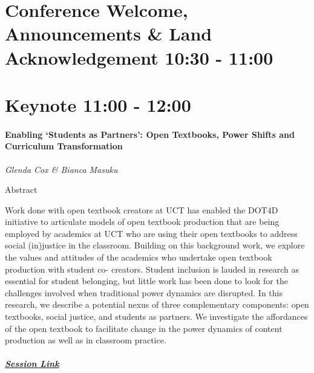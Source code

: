 \documentclass[
]{book}
\begin{document}
\hypertarget{conference-welcome-announcements-land-acknowledgement-1030---1100}{%
\section*{Conference Welcome, Announcements \& Land Acknowledgement \textbar{} 10:30 - 11:00}\label{conference-welcome-announcements-land-acknowledgement-1030---1100}}

\hypertarget{keynote-1100---1200}{%
\section*{Keynote \textbar{} 11:00 - 12:00}\label{keynote-1100---1200}}

\begin{keynote}
\hypertarget{enabling-students-as-partners-open-textbooks-power-shifts-and-curriculum-transformation}{%
\paragraph*{Enabling `Students as Partners': Open Textbooks, Power
Shifts and Curriculum
Transformation}\label{enabling-students-as-partners-open-textbooks-power-shifts-and-curriculum-transformation}}

\emph{Glenda Cox \& Bianca Masuku}

Abstract

Work done with open textbook creators at UCT has enabled the DOT4D
initiative to articulate models of open textbook production that are
being employed by academics at UCT who are using their open textbooks to
address social (in)justice in the classroom. Building on this background
work, we explore the values and attitudes of the academics who undertake
open textbook production with student co- creators. Student inclusion is
lauded in research as essential for student belonging, but little work
has been done to look for the challenges involved when traditional power
dynamics are disrupted. In this research, we describe a potential nexus
of three complementary components: open textbooks, social justice, and
students as partners. We investigate the affordances of the open
textbook to facilitate change in the power dynamics of content
production as well as in classroom practice.

\hypertarget{session-link}{%
\subparagraph*{\texorpdfstring{\href{}{Session
Link}}{Session Link}}\label{session-link}}
\end{keynote}
\end{document}
